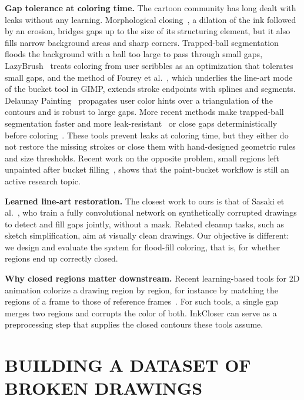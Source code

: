 \documentclass{IEEEcsmag}
\providecommand{\DIFaddtex}[1]{{\color{blue}#1}} %
\providecommand{\DIFdeltex}[1]{} %
\providecommand{\DIFaddbegin}{} %
\providecommand{\DIFaddend}{} %
\providecommand{\DIFdelbegin}{} %
\providecommand{\DIFdelend}{} %
\providecommand{\DIFaddtex}[1]{\DIFaddtex{#1}} %
\providecommand{\DIFdeltex}[1]{\DIFdeltex{#1}} %
\providecommand{\DIFaddbegin}{} %
\providecommand{\DIFadd}[1]{\texorpdfstring{\DIFaddtex{#1}}{#1}} %
\providecommand{\DIFdel}[1]{\texorpdfstring{\DIFdeltex{#1}}{}} %
\begin{document}
\textbf{Gap tolerance at coloring time.} The cartoon community has long dealt with
leaks without any learning. Morphological closing~\cite{serra1982morphology}, a
dilation of the ink followed by an erosion, bridges gaps up to the size of its
structuring element, but it also fills narrow background areas and sharp corners.
Trapped-ball segmentation~\cite{zhang2009vectorizing} floods the background with a
ball too large to pass through small gaps, LazyBrush~\cite{sykora2009lazybrush}
treats coloring from user scribbles as an optimization that tolerates small gaps,
and the method of Fourey et al.~\cite{fourey2018flat}, which underlies the line-art
mode of the bucket tool in GIMP, extends stroke endpoints with splines and segments.
Delaunay Painting~\cite{parakkat2022delaunay} propagates user color hints over a
triangulation of the contours and is robust to large gaps. \DIFaddbegin \DIFadd{More recent methods make
trapped-ball segmentation faster and more leak-resistant~\cite{allen2024leak} or
close gaps deterministically before coloring~\cite{asrin2025gap}. }\DIFaddend These tools prevent leaks
at coloring time, but they either do not restore the missing strokes or close them
with hand-designed geometric rules and size thresholds. Recent work on the opposite
problem, small regions left unpainted after bucket filling~\cite{kono2026gapfill},
shows that the paint-bucket workflow is still an active research topic.

\textbf{Learned line-art restoration.} The closest work to ours is that of Sasaki et
al.~\cite{sasaki2017joint}, who train a fully convolutional network on synthetically
corrupted drawings to detect and fill gaps jointly, without a mask. Related cleanup
tasks, such as sketch simplification\DIFdelbegin \DIFdel{~\cite{simoserra2016simplify}}\DIFdelend , aim at visually
clean drawings. Our objective is different: we design and evaluate the system for
flood-fill coloring, that is, for whether regions end up correctly closed.

\textbf{Why closed regions matter downstream.} Recent learning-based tools for 2D
animation colorize a drawing region by region, for instance by matching the regions
of a frame to those of reference frames~\DIFdelbegin \DIFdel{\cite{casey2021animation,dai2024inclusion}}\DIFdelend \DIFaddbegin \DIFadd{\cite{dai2024inclusion}}\DIFaddend .
For such tools, a single gap merges two regions and corrupts the color of both.
InkCloser can serve as a preprocessing step that supplies the closed contours these
tools assume.

\section{BUILDING A DATASET OF BROKEN DRAWINGS}
\end{document}
